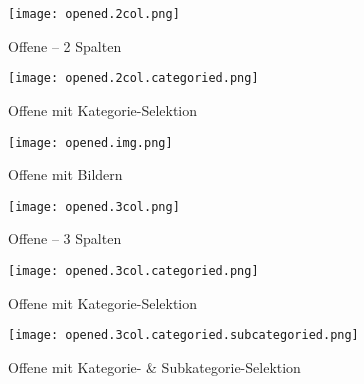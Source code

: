 \begin{figure}[!htb]
    \centering
    \begin{minipage}[b]{0.45\textwidth}
        \centering
        \texttt{[image: opened.2col.png]}
        \caption{\centering Offene  – 2 Spalten}
        \label{img:openedTwoColNewComp}
    \end{minipage}
    \hfill
    \begin{minipage}[b]{0.45\textwidth}
        \centering
        \texttt{[image: opened.2col.categoried.png]}
        \caption{\centering Offene  mit Kategorie-Selektion}
        \label{img:openedTwoColCatNewComp}
    \end{minipage}
\end{figure}

\begin{figure}[!htb]
    \centering
    \begin{minipage}[b]{0.45\textwidth}
        \centering
        \texttt{[image: opened.img.png]}
        \caption{\centering Offene  mit Bildern}
        \label{img:openedTwoColImgNewComp}
    \end{minipage}
    \hfill
    \begin{minipage}[b]{0.45\textwidth}
        \centering
        \texttt{[image: opened.3col.png]}
        \caption{\centering Offene  – 3 Spalten}
        \label{img:openedThreeColNewComp}
    \end{minipage}
\end{figure}

\begin{figure}[!htb]
    \centering
    \begin{minipage}[b]{0.45\textwidth}
        \centering
        \texttt{[image: opened.3col.categoried.png]}
        \caption{\centering Offene  mit Kategorie-Selektion}
        \label{img:openedThreeColCatNewComp}
    \end{minipage}
    \hfill
    \begin{minipage}[b]{0.45\textwidth}
        \centering
        \texttt{[image: opened.3col.categoried.subcategoried.png]}
        \caption{\centering Offene  mit Kategorie- \& Subkategorie-Selektion}
        \label{img:openedThreeColCatSubcatNewComp}
    \end{minipage}
\end{figure}

